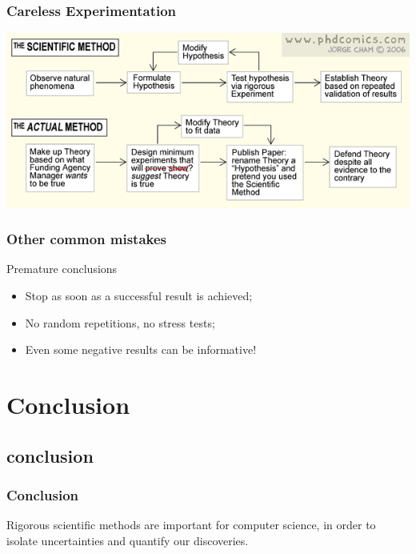 \documentclass{beamer}
\begin{document}
\begin{frame}
\frametitle{Careless Experimentation}
\begin{center}
  \includegraphics[width=1\textwidth]{img/phdcomics}
\end{center}
\end{frame}

\begin{frame}
  \frametitle{Other common mistakes}
  \begin{block}{Premature conclusions}
    \begin{itemize}
    \item Stop as soon as a successful result is achieved;
    \item No random repetitions, no stress tests;
    \item Even some negative results can be informative!
    \end{itemize}
  \end{block}
\end{frame}






\section{Conclusion}
\subsection{conclusion}

\begin{frame}
  \frametitle{Conclusion} Rigorous scientific methods are important
  for computer science, in order to isolate uncertainties and quantify
  our discoveries.
\end{frame}
\end{document}
